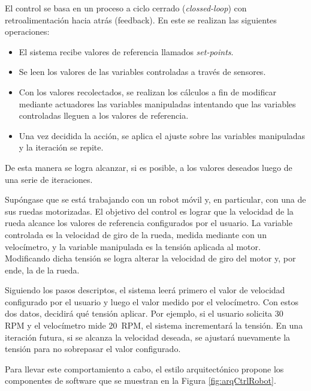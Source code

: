El control se basa en un proceso a ciclo cerrado (\textit{clossed-loop}) con retroalimentación hacia atrás (feedback). En este se realizan las siguientes operaciones:
\begin{itemize}
\item El sistema recibe valores de referencia llamados \textit{set-points}.
\item Se leen los valores de las variables controladas a través de sensores.
\item Con los valores recolectados, se realizan los cálculos a fin de modificar mediante actuadores las variables manipuladas intentando que las variables controladas lleguen a los valores de referencia.
\item Una vez decidida la acción, se aplica el ajuste sobre las variables manipuladas y la iteración se repite.
\end{itemize}

De esta manera se logra alcanzar, si es posible, a los valores deseados luego de una serie de iteraciones.

Supóngase que se está trabajando con un robot móvil y, en particular, con una de sus ruedas motorizadas. El objetivo del control es lograr que la velocidad de la rueda alcance los valores de referencia configurados por el usuario. La variable controlada es la velocidad de giro de la rueda, medida mediante con un velocímetro, y la variable manipulada es la tensión aplicada al motor. Modificando dicha tensión se logra alterar la velocidad de giro del motor y, por ende, la de la rueda.

Siguiendo los pasos descriptos, el sistema leerá primero el valor de velocidad configurado por el usuario y luego el valor medido por el velocímetro. Con estos dos datos, decidirá qué tensión aplicar. Por ejemplo, si el usuario solicita 30  \gls{RPM} y el velocímetro mide 20  \gls{RPM}, el sistema incrementará la tensión. En una iteración futura, si se alcanza la velocidad deseada, se ajustará nuevamente la tensión para no sobrepasar el valor configurado.

Para llevar este comportamiento a cabo, el estilo arquitectónico propone los componentes de software que se muestran en la Figura \ref{fig:arqCtrlRobot}.


